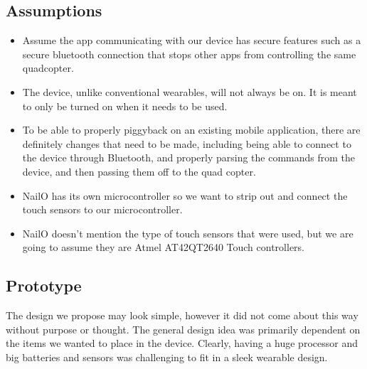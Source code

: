 \documentclass[12pt,letterpaper]{article}
\begin{document}
\subsection*{Assumptions}
\begin{itemize}
\item Assume the app communicating with our device has secure features such as a secure bluetooth connection that stops other apps from controlling the same quadcopter. 
\item The device, unlike conventional wearables, will not always be on. It is meant to only be turned on when it needs to be used. 
\item To be able to properly piggyback on an existing mobile application, there are definitely changes that need to be made, including being able to connect to the device through Bluetooth, and properly parsing the commands from the device, and then passing them off to the quad copter.
\item NailO has its own microcontroller so we want to strip out and connect the touch sensors to our microcontroller.
\item NailO doesn't mention the type of touch sensors that were used, but we are going to assume they are Atmel AT42QT2640 Touch controllers.
\end{itemize}

\subsection*{Prototype}
\hspace{1cm}The design we propose may look simple, however it did not come about this way without purpose or thought. The general design idea was primarily dependent on the items we wanted to place in the device. Clearly, having a huge processor and big batteries and sensors was challenging to fit in a sleek wearable design.\\
\end{document}
